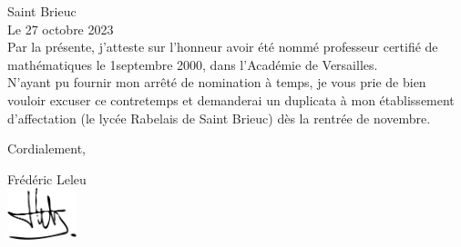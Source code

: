 \documentclass[12pt,a4paper,article,english,firamath]{nsi}
\begin{document}
\classe{}
\maketitle

Saint Brieuc\\
Le 27 octobre 2023\\

Par la présente, j'atteste sur l'honneur avoir été nommé professeur certifié de mathématiques le 1\er septembre 2000, dans l'Académie de Versailles.\\

N'ayant pu fournir mon arrêté de nomination à temps, je vous prie de bien vouloir excuser ce contretemps et demanderai un duplicata à mon établissement d'affectation (le lycée Rabelais de Saint Brieuc) dès la rentrée de novembre.

Cordialement,

\begin{flushright}
    Frédéric Leleu\\
    \includegraphics[width = 2cm]{signature.png}
\end{flushright}
\end{document}
